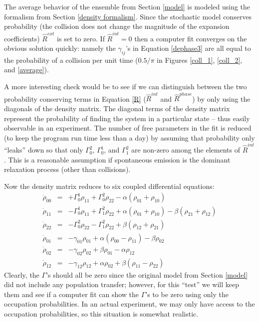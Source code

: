 The average behavior of the ensemble from Section \ref{model} is modeled using the formalism from Section \ref{density formalism}. Since the stochastic model conserves probability (the collision does not change the magnitude of the expansion coefficients) $\hat{R}^{ext}$ is set to zero. If $\hat{R}^{int}=0$ then a computer fit converges on the obvious solution quickly: namely the $\gamma_{ij}$'s in Equation \ref{dephase3} are all equal to the probability of a collision per unit time ($0.5/\pi$ in Figures \ref{coll_1}, \ref{coll_2}, and \ref{average}).

A more interesting check would be to see if we can distinguish between the two probability conserving terms in Equation \ref{R} ($\hat{R}^{int}$ and $\hat{R}^{phase}$) by only using the diagonals of the density matrix. The diagonal terms of the density matrix represent the probability of finding the system in a particular state -- thus easily observable in an experiment. The number of free parameters in the fit is reduced (to keep the program run time less than a day) by assuming that probability only ``leaks'' down so that only $\Gamma^{2}_{0}$, $\Gamma^{1}_{0}$, and $\Gamma^{2}_{1}$ are non-zero among the elements of $\hat{R}^{int}$. This is a reasonable assumption if spontaneous emission is the dominant relaxation process (other than collisions).

Now the density matrix reduces to six coupled differential equations:
\begin{subequations}
\begin{eqnarray}
\dot{\rho}_{00}&=&
+\Gamma^{1}_{0}\rho_{11} + \Gamma^{2}_{0}\rho_{22}
- \alpha (\rho_{01} + \rho_{10})\\
\dot{\rho}_{11}&=&
-\Gamma^{1}_{0}\rho_{11} + \Gamma^{2}_{1}\rho_{22}
+ \alpha (\rho_{01} + \rho_{10}) - \beta (\rho_{21} + \rho_{12})\\
\dot{\rho}_{22}&=&
-\Gamma^{2}_{0}\rho_{22} - \Gamma^{2}_{1}\rho_{22}
+ \beta (\rho_{12} + \rho_{21})\\
\dot{\rho}_{01}&=&
-\gamma_{01}\rho_{01}
+ \alpha (\rho_{00} - \rho_{11}) - \beta\rho_{02}\\
\dot{\rho}_{02}&=&
-\gamma_{02}\rho_{02}
+ \beta\rho_{01} - \alpha\rho_{12}\\
\dot{\rho}_{12}&=&
-\gamma_{12}\rho_{12}
+ \alpha\rho_{02} + \beta (\rho_{11} - \rho_{22})
\end{eqnarray}
\label{fit dynamics}
\end{subequations}
Clearly, the $\Gamma$'s should all be zero since the original model from Section \ref{model} did not include any population transfer; however, for this ``test'' we will keep them and see if a computer fit can show the $\Gamma$'s to be zero using only the occupation probabilities. In an actual experiment, we may only have access to the occupation probabilities, so this situation is somewhat realistic.

